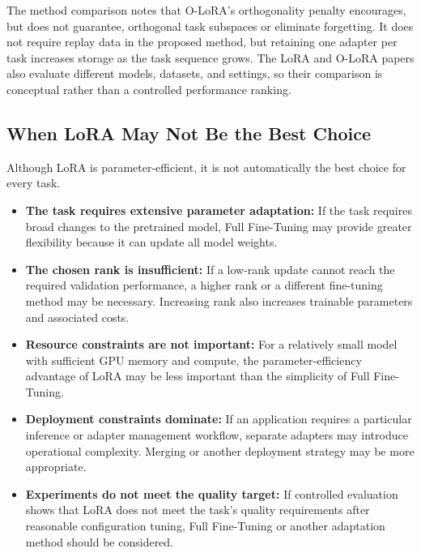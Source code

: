 The method comparison notes that O-LoRA's orthogonality penalty
encourages, but does not guarantee, orthogonal task subspaces or
eliminate forgetting. It does not require replay data in the proposed
method, but retaining one adapter per task increases storage as the
task sequence grows. The LoRA and O-LoRA papers also evaluate
different models, datasets, and settings, so their comparison is
conceptual rather than a controlled performance ranking.

\subsection{When LoRA May Not Be the Best Choice}

Although LoRA is parameter-efficient, it is not automatically
the best choice for every task.

\begin{itemize}
	\item \textbf{The task requires extensive parameter adaptation:}
	      If the task requires broad changes to the pretrained model,
	      Full Fine-Tuning may provide greater flexibility because it
	      can update all model weights.

	\item \textbf{The chosen rank is insufficient:}
	      If a low-rank update cannot reach the required validation
	      performance, a higher rank or a different fine-tuning method
	      may be necessary. Increasing rank also increases trainable
	      parameters and associated costs.

	\item \textbf{Resource constraints are not important:}
	      For a relatively small model with sufficient GPU memory and
	      compute, the parameter-efficiency advantage of LoRA may be
	      less important than the simplicity of Full Fine-Tuning.

	\item \textbf{Deployment constraints dominate:}
	      If an application requires a particular inference or adapter
	      management workflow, separate adapters may introduce
	      operational complexity. Merging or another deployment
	      strategy may be more appropriate.

	\item \textbf{Experiments do not meet the quality target:}
	      If controlled evaluation shows that LoRA does not meet the
	      task's quality requirements after reasonable configuration
	      tuning, Full Fine-Tuning or another adaptation method should
	      be considered.
\end{itemize}

